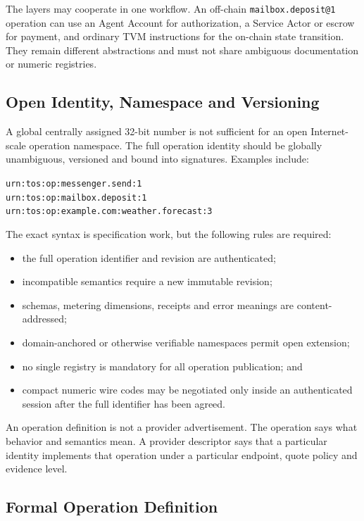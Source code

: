 \documentclass[11pt,oneside]{article}
\newcommand{\opid}[1]{\texttt{#1}}
\begin{document}
The layers may cooperate in one workflow. An off-chain
\opid{mailbox.deposit@1} operation can use an Agent Account for authorization, a Service Actor
or escrow for payment, and ordinary TVM instructions for the on-chain state transition.
They remain different abstractions and must not share ambiguous documentation or numeric
registries.

\subsection{Open Identity, Namespace and Versioning}

A global centrally assigned 32-bit number is not sufficient for an open Internet-scale
operation namespace. The full operation identity should be globally unambiguous, versioned
and bound into signatures. Examples include:

\begin{center}
\texttt{urn:tos:op:messenger.send:1}\\
\texttt{urn:tos:op:mailbox.deposit:1}\\
\texttt{urn:tos:op:example.com:weather.forecast:3}
\end{center}

The exact syntax is specification work, but the following rules are required:

\begin{itemize}
  \item the full operation identifier and revision are authenticated;
  \item incompatible semantics require a new immutable revision;
  \item schemas, metering dimensions, receipts and error meanings are content-addressed;
  \item domain-anchored or otherwise verifiable namespaces permit open extension;
  \item no single registry is mandatory for all operation publication; and
  \item compact numeric wire codes may be negotiated only inside an authenticated session
        after the full identifier has been agreed.
\end{itemize}

An operation definition is not a provider advertisement. The operation says what behavior and
semantics mean. A provider descriptor says that a particular identity implements that
operation under a particular endpoint, quote policy and evidence level.

\subsection{Formal Operation Definition}
\end{document}
